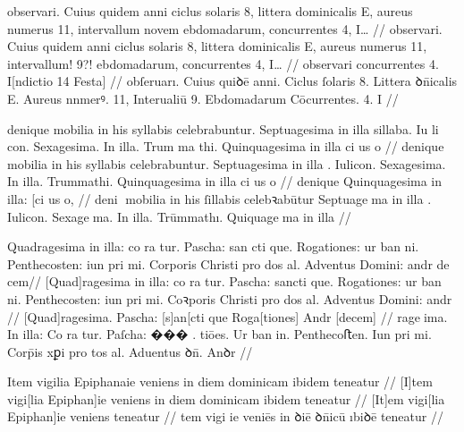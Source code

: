 \ex \bg
\gla
{}
observari. Cuius quidem 
anni ciclus solaris 8, littera dominicalis 
E, aureus numerus 11, intervallum novem {} ebdomadarum, concurrentes 4, 
{I\ldots} {} {}
//
\glRekonstrukcja
{}
observari. Cuius quidem {}
anni ciclus solaris 8, littera dominicalis 
E, aureus numerus 11, intervallum! {} {9?!} ebdomadarum, concurrentes 4, 
{I\ldots} {} {}
//
\glUbytki
{}
observari
{} {} {} {} {} {} {} {} {}
{} {} {} {} {} {} {} {}
concurrentes 4. I[ndictio 14 Festa]
//
\glU
{}
obſeruarı. Cuius quiꝺē {} anni. Ciclus ſolaris 8. Littera ꝺn̄icalis E. Aureus nnmerꝰ. 11, Interualiū {} {9}. Ebdomadarum Cōcurrentes. 4. I {} {}
//
\endgl
\xe


\ex \bg
\gla
{}
denique mobilia in his syllabis celebrabuntur. Septuagesima in illa sillaba. {Iu li con}.
Sexagesima. In illa. {Trum ma thi}. Quinquagesima in illa {ci us o}
{} {} {} {}
//
\glRekonstrukcja
{}
denique mobilia in his syllabis celebrabuntur. Septuagesima in illa {}.  Iulicon.
Sexagesima. In illa. Trummathi. Quinquagesima in illa {ci us o}
{} {} {} {}
//
\glUbytki
{}
denique
{} {} {} {} {} {} {} {} {}
{} {} {} {} {}
Quinquagesima in illa: [ci
us o,
//
\glU
{}
deni mobilia in his ſillabis celebꝛabūtur Septuagema in illa {}.  Iulicon. Sexagema. In illa. Trūmmathı. Quiquagema in illa
//
\endgl
\xe



\ex \bg
\gla
{}
Quadragesima in illa: co ra tur. Pascha: {san cti} 
que. Rogationes: ur ban ni. Penthecosten: iun pri mi. Corporis Christi pro dos al. Adventus Domini: andr
{de cem}//
\glRekonstrukcja
{}
[Quad]ragesima in illa: co ra tur. Pascha: {sancti} 
que. Rogationes: ur ban ni. Penthecosten: iun pri mi. Coꝛporis Christi pro dos al. Adventus Domini: andr
{} {}
//
\glUbytki
{}
[Quad]ragesima.
{} {} {} {} {}
Pascha: {[s]an[cti} que Roga[tiones]
{} {} {} {} {} {} {} {} {}
{} {} {} {} {}
Andr [decem]
//
\glU
{}
rageima. In illa: Co ra tur. Paſcha: ��� . tiōes. Ur ban in. Penthecoﬅen. Iun pri mi. Corp̄is xꝑi pro tos al. Aduentus ꝺn̄. Anꝺr
//
\endgl
\xe



\ex \bg
\gla
{}
Item
vigilia Epiphanaie veniens
in diem dominicam ibidem 
teneatur
//
\glRekonstrukcja
{}
[I]tem
vigi[lia Epiphan]ie veniens
in diem dominicam ibidem 
teneatur
//
\glUbytki
{}
[It]em
vigi[lia Epiphan]ie veniens
{} {} {} {}
teneatur
//
\glU
{}
tem vigi ie veniēs in ꝺiē ꝺn̄icū ıbiꝺē teneatur
//
\endgl
\xe



